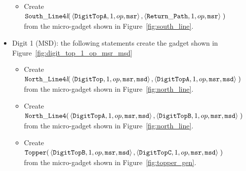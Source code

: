 \begin{itemize}
\begin{itemize}
            \item Create
            $\begin{aligned}[t]
                {\tt South\_Line4\textit{l}}(& \left\langle {\tt DigitTopA}, 1, op, {\tt msr}\right\rangle,
                                               \left\langle {\tt Return\_Path},     1, op, {\tt msr}\right\rangle \;)
            \end{aligned}$ \\ from the micro-gadget shown in Figure~\ref{fig:south_line}.
        \end{itemize}
        \vspace{1cm}


        \item Digit 1 (MSD): the following statements create the gadget shown in Figure~\ref{fig:digit_top_1_op_msr_msd}
        \begin{itemize}
            \item Create
            $\begin{aligned}[t]
                {\tt North\_Line4\textit{l}}(& \left\langle {\tt DigitTop},  1, op, {\tt msr}, {\tt msd}\right\rangle,
                                               \left\langle {\tt DigitTopA}, 1, op, {\tt msr}, {\tt msd}\right\rangle \;)
            \end{aligned}$\\from the micro-gadget shown in Figure~\ref{fig:north_line}.

            \item Create $\begin{aligned}[t]
                {\tt North\_Line4}(& \left\langle {\tt DigitTopA}, 1, op, {\tt msr}, {\tt msd}\right\rangle,
                                     \left\langle {\tt DigitTopB}, 1, op, {\tt msr}, {\tt msd}\right\rangle \;)
            \end{aligned}$\\from the micro-gadget shown in Figure~\ref{fig:north_line}.

            \item Create $\begin{aligned}[t]
                {\tt Topper}(& \left\langle {\tt DigitTopB}, 1, op, {\tt msr}, {\tt msd}\right\rangle,
                               \left\langle {\tt DigitTopC}, 1, op, {\tt msr}, {\tt msd}\right\rangle \;)
            \end{aligned}$\\from the micro-gadget shown in Figure~\ref{fig:topper_gen}.


\end{itemize}
\end{itemize}
